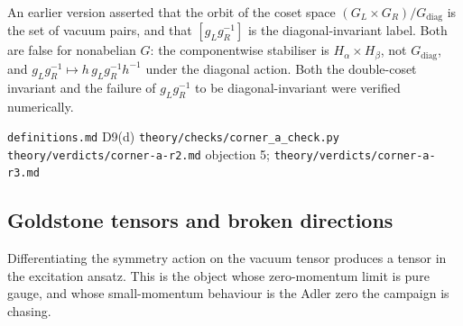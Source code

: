\begin{remark}
An earlier version asserted that the orbit of the coset space
$(G_{L} \times G_{R})/G_{\mathrm{diag}}$ is the set of vacuum pairs, and that
$[g_{L} g_{R}^{-1}]$ is the diagonal-invariant label. Both are false for
nonabelian $G$: the componentwise stabiliser is
$H_{\alpha} \times H_{\beta}$, not $G_{\mathrm{diag}}$, and
$g_{L} g_{R}^{-1} \mapsto h \, g_{L} g_{R}^{-1} h^{-1}$ under the diagonal
action. Both the double-coset invariant and the failure of
$g_{L} g_{R}^{-1}$ to be diagonal-invariant were verified numerically.
\end{remark}

%
{\texttt{definitions.md} D9(d)}%
{\texttt{theory/checks/corner\_a\_check.py}}%
{\texttt{theory/verdicts/corner-a-r2.md} objection 5;
 \texttt{theory/verdicts/corner-a-r3.md}}

\subsection{Goldstone tensors and broken directions}

Differentiating the symmetry action on the vacuum tensor produces a tensor in
the excitation ansatz. This is the object whose zero-momentum limit is pure
gauge, and whose small-momentum behaviour is the Adler zero the campaign is
chasing.


